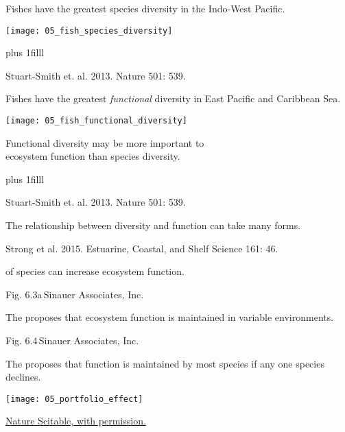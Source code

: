 \documentclass[t]{beamer}
\begin{document}
%
\begin{frame}[t]{Fishes have the greatest species diversity in the Indo-West Pacific.}

	\texttt{[image: 05\_fish\_species\_diversity]}
	
	\vskip0pt plus 1filll 
	
	\hfill\tiny Stuart-Smith et. al. 2013. Nature 501: 539.
	
\end{frame}
%
\begin{frame}[t]{Fishes have the greatest \emph{functional} diversity in East Pacific and Caribbean Sea.}

	\texttt{[image: 05\_fish\_functional\_diversity]}
	
	\vspace*{-0.5\baselineskip}
	
	\hangpara Functional diversity may be more important to \\ecosystem function than species diversity.
	
	\vskip0pt plus 1filll 
	
	\hfill\tiny Stuart-Smith et. al. 2013. Nature 501: 539.
\end{frame}
%
{
\begin{frame}[b]{The relationship between diversity and function can take many forms.}


	\hfill\tiny Strong et al. 2015. Estuarine, Coastal, and Shelf Science 161: 46.
\end{frame}
}
%
{
\begin{frame}[b]{ of species can increase ecosystem function.}

\hfill\tiny Fig. 6.3a\,\textcopyright Sinauer Associates, Inc.
\end{frame}
}
%
{
\begin{frame}[b]{The  proposes that ecosystem function is maintained in variable environments.}

\hfill\tiny Fig. 6.4\,\textcopyright Sinauer Associates, Inc.
\end{frame}
}
%
\begin{frame}[b]{The  proposes that function is maintained by most species if any one species declines.}

\centering
\texttt{[image: 05\_portfolio\_effect]}

\hfill\tiny \href{http://www.nature.com/scitable/knowledge/library/biodiversity-and-ecosystem-services-is-it-the-96677163}{\textcopyright Nature Scitable, with permission.}
\end{frame}
\end{document}
